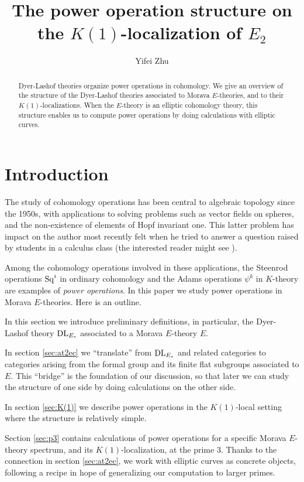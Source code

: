 \documentclass{gtpart}
\title{The power operation structure on the $K(1)$-localization of $E_2$}
\author{Yifei Zhu}
\theoremstyle{definition}
\theoremstyle{remark}
\newcommand{\DL}{{\rm DL}}
\begin{document}
\begin{abstract}
 Dyer-Lashof theories organize power operations in cohomology.  We give an 
 overview of the structure of the Dyer-Lashof theories associated to Morava 
 $E$-theories, and to their $K(1)$-localizations.  When the $E$-theory is an 
 elliptic cohomology theory, this structure enables us to compute power 
 operations by doing calculations with elliptic curves.  
\end{abstract}


\maketitle
\section{Introduction}
\label{sec:intro}

The study of cohomology operations has been central to algebraic topology 
since the 1950s, with applications to solving problems such as vector fields 
on spheres, and the non-existence of elements of Hopf invariant one.  This 
latter problem has impact on the author most recently felt when he tried to 
answer a question raised by students in a calculus class (the interested 
reader might see \cite[theorem II]{massey}).  

Among the cohomology operations involved in these applications, the Steenrod 
operations ${\rm Sq}^i$ in ordinary cohomology and the Adams operations 
$\psi^k$ in $K$-theory are examples of {\em power operations}.  In this paper 
we study power operations in Morava $E$-theories.  Here is an outline.  

In this section we introduce preliminary definitions, in particular, the 
Dyer-Lashof theory $\DL_{E_*}$ associated to a Morava $E$-theory $E$.  

In section \ref{sec:at2ec} we ``translate'' from $\DL_{E_*}$ and related 
categories to categories arising from the formal group and its finite flat 
subgroups associated to $E$.  This ``bridge'' is the foundation of our 
discussion, so that later we can study the structure of one side by doing 
calculations on the other side.  

In section \ref{sec:K(1)} we describe power operations in the $K(1)$-local 
setting where the structure is relatively simple.  

Section \ref{sec:p3} contains calculations of power operations for a specific 
Morava $E$-theory spectrum, and its $K(1)$-localization, at the prime 3.  
Thanks to the connection in section \ref{sec:at2ec}, we work with elliptic 
curves as concrete objects, following a recipe in hope of generalizing our 
computation to larger primes.  
\end{document}
